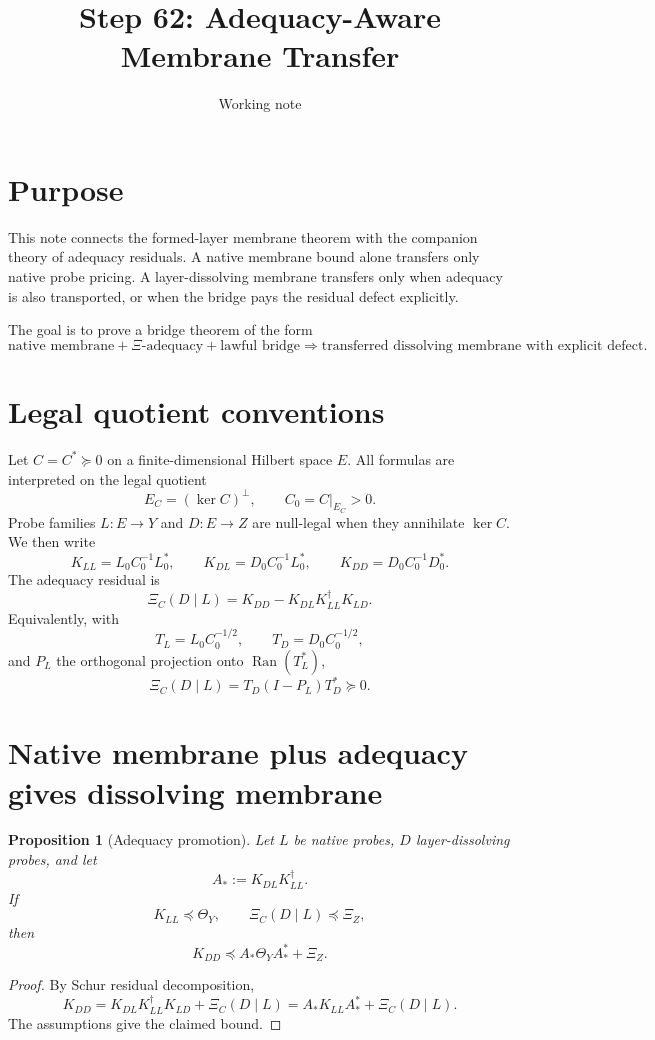\documentclass[11pt]{article}
\title{Step 62: Adequacy-Aware Membrane Transfer}
\author{Working note}
\date{}
\newtheorem{proposition}{Proposition}
\newcommand{\range}{\operatorname{Ran}}
\begin{document}
\maketitle

\section{Purpose}
This note connects the formed-layer membrane theorem with the companion theory of adequacy residuals.  A native membrane bound alone transfers only native probe pricing.  A layer-dissolving membrane transfers only when adequacy is also transported, or when the bridge pays the residual defect explicitly.

The goal is to prove a bridge theorem of the form
\[
\text{native membrane} + \Xi\text{-adequacy} + \text{lawful bridge}
\Rightarrow
\text{transferred dissolving membrane with explicit defect}.
\]

\section{Legal quotient conventions}
Let \(C=C^*\succeq0\) on a finite-dimensional Hilbert space \(E\).  All formulas are interpreted on the legal quotient
\[
E_C=(\ker C)^\perp,\qquad C_0=C|_{E_C}>0.
\]
Probe families \(L:E\to Y\) and \(D:E\to Z\) are null-legal when they annihilate \(\ker C\).  We then write
\[
K_{LL}=L_0C_0^{-1}L_0^*,\qquad
K_{DL}=D_0C_0^{-1}L_0^*,\qquad
K_{DD}=D_0C_0^{-1}D_0^*.
\]
The adequacy residual is
\[
\Xi_C(D\mid L)=K_{DD}-K_{DL}K_{LL}^{\dagger}K_{LD}.
\]
Equivalently, with
\[
T_L=L_0C_0^{-1/2},\qquad T_D=D_0C_0^{-1/2},
\]
and \(P_L\) the orthogonal projection onto \(\range(T_L^*)\),
\[
\Xi_C(D\mid L)=T_D(I-P_L)T_D^*\succeq0.
\]

\section{Native membrane plus adequacy gives dissolving membrane}
\begin{proposition}[Adequacy promotion]
Let \(L\) be native probes, \(D\) layer-dissolving probes, and let
\[
A_*:=K_{DL}K_{LL}^{\dagger}.
\]
If
\[
K_{LL}\preceq \Theta_Y,
\qquad
\Xi_C(D\mid L)\preceq \Xi_Z,
\]
then
\[
K_{DD}\preceq A_*\Theta_YA_*^*+\Xi_Z.
\]
\end{proposition}

\begin{proof}
By Schur residual decomposition,
\[
K_{DD}=K_{DL}K_{LL}^{\dagger}K_{LD}+\Xi_C(D\mid L)=A_*K_{LL}A_*^*+\Xi_C(D\mid L).
\]
The assumptions give the claimed bound.
\end{proof}
\end{document}
